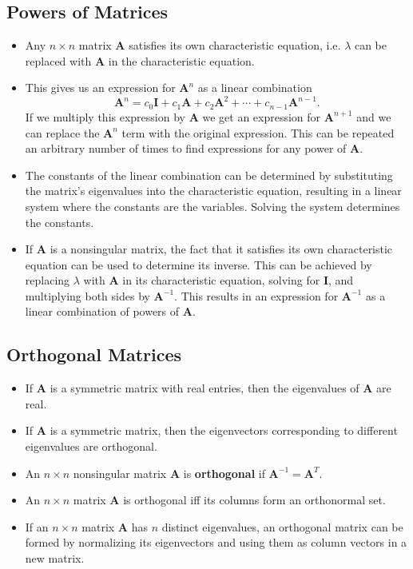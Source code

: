 \documentclass{article}
\begin{document}
\subsection{Powers of Matrices}

\begin{itemize}
  \item Any $n \times n$ matrix $\mathbf{A}$ satisfies its own characteristic equation, i.e. $\lambda$ can be replaced with $\mathbf{A}$ in the characteristic equation.

  \item This gives us an expression for $\mathbf{A}^n$ as a linear combination \[\mathbf{A}^n = c_0 \mathbf{I} + c_1 \mathbf{A} + c_2 \mathbf{A}^2 + \cdots + c_{n - 1} \mathbf{A}^{n - 1}.\] If we multiply this expression by $\mathbf{A}$ we get an expression for $\mathbf{A}^{n + 1}$ and we can replace the $\mathbf{A}^n$ term with the original expression. This can be repeated an arbitrary number of times to find expressions for any power of $\mathbf{A}$.

  \item The constants of the linear combination can be determined by substituting the matrix's eigenvalues into the characteristic equation, resulting in a linear system where the constants are the variables. Solving the system determines the constants.

  \item If $\mathbf{A}$ is a nonsingular matrix, the fact that it satisfies its own characteristic equation can be used to determine its inverse. This can be achieved by replacing $\lambda$ with $\mathbf{A}$ in its characteristic equation, solving for $\mathbf{I}$, and multiplying both sides by $\mathbf{A}^{-1}$. This results in an expression for $\mathbf{A}^{-1}$ as a linear combination of powers of $\mathbf{A}$.
\end{itemize}

\subsection{Orthogonal Matrices}

\begin{itemize}
  \item If $\mathbf{A}$ is a symmetric matrix with real entries, then the eigenvalues of $\mathbf{A}$ are real.

  \item If $\mathbf{A}$ is a symmetric matrix, then the eigenvectors corresponding to different eigenvalues are orthogonal.

  \item An $n \times n$ nonsingular matrix $\mathbf{A}$ is \textbf{orthogonal} if $\mathbf{A}^{-1} = \mathbf{A}^T$.

  \item An $n \times n$ matrix $\mathbf{A}$ is orthogonal iff its columns form an orthonormal set.

  \item If an $n \times n$ matrix $\mathbf{A}$ has $n$ distinct eigenvalues, an orthogonal matrix can be formed by normalizing its eigenvectors and using them as column vectors in a new matrix.
\end{itemize}
\end{document}
